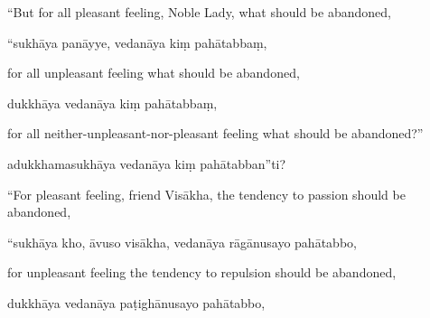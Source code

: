 \begin{samepage}
\begin{leftcolumn*}
“But for all pleasant feeling, Noble Lady, what should be abandoned,
\end{leftcolumn*}

\begin{rightcolumn}
“sukhāya panāyye, vedanāya kiṃ pahātabbaṃ,
\end{rightcolumn}
\end{samepage}

\begin{samepage}
\begin{leftcolumn*}
for all unpleasant feeling what should be abandoned,
\end{leftcolumn*}

\begin{rightcolumn}
dukkhāya vedanāya kiṃ pahātabbaṃ,
\end{rightcolumn}
\end{samepage}

\begin{samepage}
\begin{leftcolumn*}
for all neither-unpleasant-nor-pleasant feeling what should be abandoned?”
\end{leftcolumn*}

\begin{rightcolumn}
adukkhamasukhāya vedanāya kiṃ pahātabban”ti?
\end{rightcolumn}
\end{samepage}

\begin{samepage}
\begin{leftcolumn*}
“For pleasant feeling, friend Visākha, the tendency to passion should be abandoned,
\end{leftcolumn*}

\begin{rightcolumn}
“sukhāya kho, āvuso visākha, vedanāya rāgānusayo pahātabbo,
\end{rightcolumn}
\end{samepage}

\begin{samepage}
\begin{leftcolumn*}
for unpleasant feeling the tendency to repulsion should be abandoned,
\end{leftcolumn*}

\begin{rightcolumn}
dukkhāya vedanāya paṭighānusayo pahātabbo,
\end{rightcolumn}
\end{samepage}

